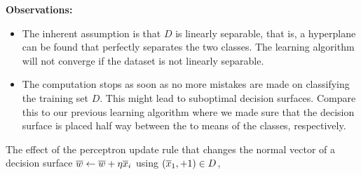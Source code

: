 \documentclass[a4paper,blends,pdf,colorBG,slideColor]{prosper}
\begin{document}

{\bf Observations:}

\begin{itemize}

\item The inherent assumption is that $D$ is linearly separable, that is,
a hyperplane can be found that perfectly separates the two classes.
The learning algorithm will not converge if the dataset is not linearly separable.

\item The computation stops as soon  as no more mistakes are made on 
classifying the training set $D$.  This might lead to suboptimal decision surfaces.
Compare this to our previous learning algorithm where we made sure that
the  decision surface is placed half way between the to means of the classes, respectively.

\end{itemize}
\es

\begin{center}
\end{center}
\es

The effect of the perceptron update rule that changes the normal vector 
of a decision surface $\overline{w} \leftarrow \overline{w} + \eta \overline{x}_i$ using
$(\overline{x}_1,+1)\in D$,
\end{document}
